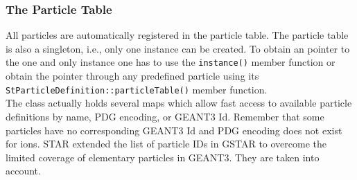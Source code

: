 \documentclass[twoside]{article}
\newcommand{\comp}[1]{\texttt{#1}}%
\begin{document}
\subsubsection{The Particle Table}
\label{sec:partTable}

All particles are automatically registered in the particle table. The
particle table is also a singleton, i.e., only one instance can be
created. To obtain an pointer to the one and only instance one has to
use the \comp{instance()} member function or obtain the pointer
through any predefined particle using its
\comp{StParticleDefinition::particleTable()} member function.\\
The class actually holds several maps which allow fast access to
available particle definitions by name, PDG encoding, or GEANT3 Id.
Remember that some particles have no corresponding GEANT3 Id and
PDG encoding does not exist for ions.  STAR extended the list of
particle IDs in GSTAR to overcome the limited coverage of elementary
particles in GEANT3. They are taken into account.
\end{document}
